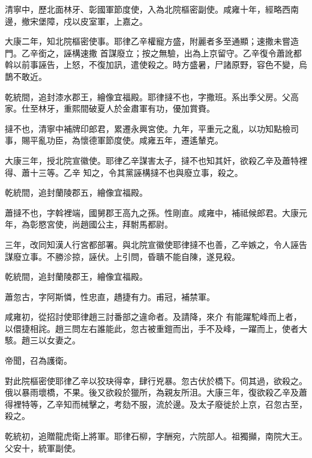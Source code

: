 \begin{pinyinscope}
 清寧中，歷北面林牙、彰國軍節度使，入為北院樞密副使。咸雍十年，經略西南邊，撤宋堡障，戍以皮室軍，上嘉之。



 大康二年，知北院樞密使事。耶律乙辛權寵方盛，附麗者多至通顯；速撒未嘗造門。乙辛銜之，誣構速撒
 首謀廢立；按之無驗，出為上京留守。乙辛復令蕭訛都斡以前事誣告，上怒，不復加訊，遣使殺之。時方盛暑，尸諸原野，容色不變，烏鵲不敢近。



 乾統間，追封漆水郡王，繪像宜福殿。耶律撻不也，字撒班。系出季父房。父高家。仕至林牙，重熙間破夏人於金肅軍有功，優加賞賚。



 撻不也，清寧中補牌印郎君，累遷永興宮使。九年，平重元之亂，以功知點檢司事，賜平亂功臣，為懷德軍節度使。咸雍五年，遷遙輦克。



 大康三年，授北院宣徽使。耶律乙辛謀害太子，撻不也知其奸，欲殺乙辛及蕭特裡得、蕭十三等。乙辛
 知之，令其黨誣構撻不也與廢立事，殺之。



 乾統間，追封蘭陵郡五，繪像宜福殿。



 蕭撻不也，字斡裡端，國舅郡王高九之孫。性剛直。咸雍中，補祗候郎君。大康元年，為彰愍宮使，尚趙國公主，拜駙馬都尉。



 三年，改同知漢人行宮都部署。與北院宣徽使耶律撻不也善，乙辛嫉之，令人誣告謀廢立事。不勝沴掠，誣伏。上引問，昏聵不能自陳，遂見殺。



 乾統間，追封蘭陵郡王，繪像宜福殿。



 蕭忽古，字阿斯憐，性忠直，趫捷有力。甫冠，補禁軍。



 咸雍初，從招討使耶律趙三討番部之違命者。及請降，來介
 有能躍駝峰而上者，以儇捷相詫。趙三問左右誰能此，忽古被重鎧而出，手不及峰，一躍而上，使者大駭。趙三以女妻之。



 帝聞，召為護衛。



 對此院樞密使耶律乙辛以狡玦得幸，肆行兇暴。忽古伏於橋下。伺其過，欲殺之。俄以暴雨壞橋，不果。後又欲殺於獵所，為親友所沮。大康三年，復欲殺乙辛及蕭得裡特等，乙辛知而械擊之，考劾不服，流於邊。及太子廢徙於上京，召忽古至，殺之。



 乾統初，追贈龍虎衛上將軍。耶律石柳，字酬宛，六院部人。祖獨攧，南院大王。父安十，統軍副使。




\end{pinyinscope}

